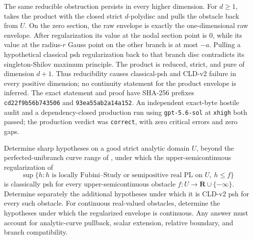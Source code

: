 The same reducible obstruction persists in every higher dimension.  For
\(d\geq1\), 
takes the product with the closed strict \(d\)-polydisc and pulls the
obstacle back from \(U\).  On the zero section, the raw envelope is exactly
the one-dimensional raw envelope.  After regularization its value at the
nodal section point is \(0\), while its value at the radius-\(r\) Gauss point
on the other branch is at most \(-a\).  Pulling a hypothetical classical psh
regularization back to that branch disc contradicts its singleton-Shilov
maximum principle.  The product is reduced, strict, and pure of dimension
\(d+1\).  Thus reducibility causes classical-psh and CLD-v2 failure in every
positive dimension; no continuity statement for the product envelope is
inferred.  The exact statement and proof have SHA-256 prefixes
\texttt{cd22f9b56b743506} and \texttt{93ea55ab2a14a152}.  An independent
exact-byte hostile audit and a dependency-closed production run using
\texttt{gpt-5.6-sol} at \texttt{xhigh} both passed; the production verdict
was \texttt{correct}, with zero critical errors and zero gaps.

\begin{problem}\label{prob:frontier-unibranch-local-envelope}
Determine sharp hypotheses on a good strict analytic domain \(U\), beyond
the perfected-unibranch curve range of
, under which the
upper-semicontinuous regularization of
\[
 \sup\{h:h\text{ is locally Fubini--Study or semipositive real PL on }U,
              \ h\leq f\}
\]
is classically psh for every upper-semicontinuous obstacle
\(f:U\to\mathbf R\cup\{-\infty\}\).  Determine separately the additional
hypotheses under which it is CLD-v2 psh for every such obstacle.  For
continuous real-valued obstacles, determine the hypotheses under which the
regularized envelope is continuous.  Any answer must account for
analytic-curve pullback, scalar extension, relative boundary, and branch
compatibility.
\end{problem}

